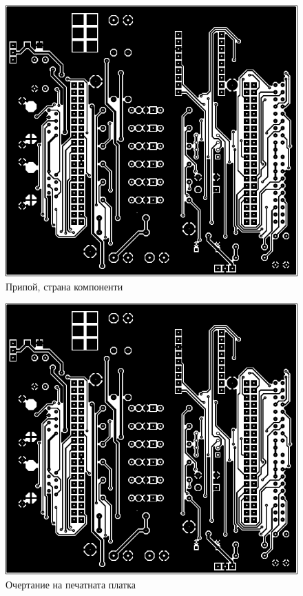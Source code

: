 \begin{figure}[!htbp]
    \centering
    \includegraphics[page=7]{documents/main_board.pdf}
    \caption{Припой, страна компоненти}
    \label{fig:main_top_paste}
\end{figure}
\begin{figure}[!htbp]
    \centering
    \includegraphics[page=8]{documents/main_board.pdf}
    \caption{Очертание на печатната платка}
    \label{fig:main_cont}
\end{figure}
